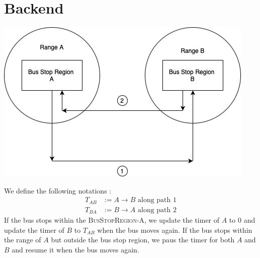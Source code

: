 \section{Backend}
\begin{center}
    \includegraphics[scale = 0.75]{Files/Images/Img1.jpeg}
\end{center}
We define the following notations : 
\begin{align*}
    T_{AB} &:= A\to B \text{ along path $1$} \\
    T_{BA} &:= B\to A \text{ along path $2$}
\end{align*}
\noindent If the bus stops within the \textsc{BusStopRegion-A}, we update the timer of $A$ to $0$ and update the timer of $B$ to $T_{AB}$ when the bus moves again. If the bus stops within the range of $A$ but outside the bus stop region, we paus the timer for both $A$ and $B$ and resume it when the bus moves again.

